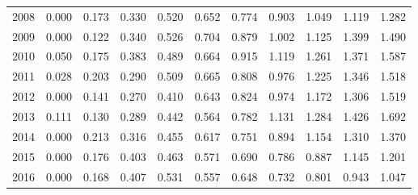 \documentclass[]{article}
\begin{document}
\begin{table}[ht]
\begin{tabular}{lrrrrrrrrrr}
  2008 & 0.000 & 0.173 & 0.330 & 0.520 & 0.652 & 0.774 & 0.903 & 1.049 & 1.119 & 1.282 \\ 
  2009 & 0.000 & 0.122 & 0.340 & 0.526 & 0.704 & 0.879 & 1.002 & 1.125 & 1.399 & 1.490 \\ 
  2010 & 0.050 & 0.175 & 0.383 & 0.489 & 0.664 & 0.915 & 1.119 & 1.261 & 1.371 & 1.587 \\ 
  2011 & 0.028 & 0.203 & 0.290 & 0.509 & 0.665 & 0.808 & 0.976 & 1.225 & 1.346 & 1.518 \\ 
  2012 & 0.000 & 0.141 & 0.270 & 0.410 & 0.643 & 0.824 & 0.974 & 1.172 & 1.306 & 1.519 \\ 
  2013 & 0.111 & 0.130 & 0.289 & 0.442 & 0.564 & 0.782 & 1.131 & 1.284 & 1.426 & 1.692 \\ 
  2014 & 0.000 & 0.213 & 0.316 & 0.455 & 0.617 & 0.751 & 0.894 & 1.154 & 1.310 & 1.370 \\ 
  2015 & 0.000 & 0.176 & 0.403 & 0.463 & 0.571 & 0.690 & 0.786 & 0.887 & 1.145 & 1.201 \\ 
  2016 & 0.000 & 0.168 & 0.407 & 0.531 & 0.557 & 0.648 & 0.732 & 0.801 & 0.943 & 1.047 \\ 
   \hline
\end{tabular}
\end{table}

\clearpage
\end{document}
